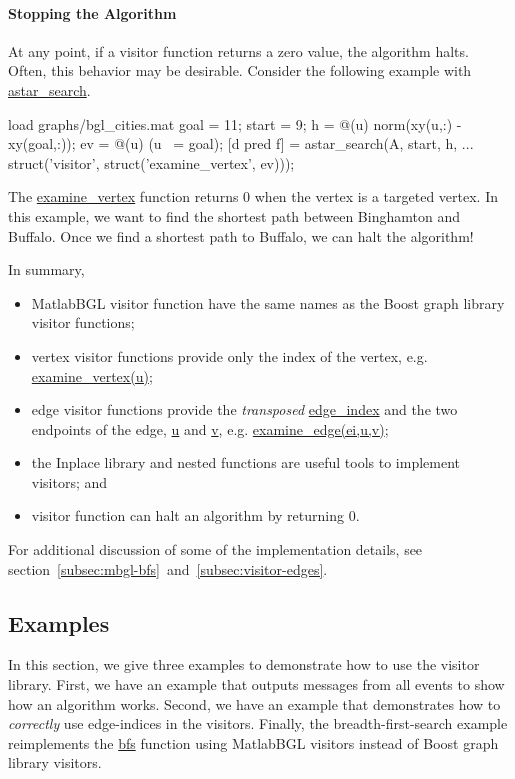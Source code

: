 \documentclass[12pt]{article}
\newcommand{\mycmd}[1]{\url{#1}}
\begin{document}
\paragraph{Stopping the Algorithm} At any point, if a visitor function returns a zero value, the algorithm halts.  Often, this behavior may be desirable.  Consider the following example with \mycmd{astar_search}.
\begin{mcode}
load graphs/bgl_cities.mat
goal = 11; %
start = 9; %
h = @(u) norm(xy(u,:) - xy(goal,:));
ev = @(u) (u ~= goal);
[d pred f] = astar_search(A, start, h, ...
    struct('visitor', struct('examine_vertex', ev)));
\end{mcode}
The \mycmd{examine_vertex} function returns 0 when the vertex is a targeted vertex.  In this example, we want to find the shortest path between Binghamton and Buffalo.  Once we find a shortest path to Buffalo, we can halt the algorithm!

In summary, 
\begin{itemize}
\item MatlabBGL visitor function have the same names as the Boost graph library visitor functions;
\item vertex visitor functions provide only the index of the vertex, e.g. \mycmd{examine_vertex(u)};
\item edge visitor functions provide the \emph{transposed} \mycmd{edge_index} and the two endpoints of the edge, \mycmd{u} and \mycmd{v}, e.g. \mycmd{examine_edge(ei,u,v)};
\item the Inplace library and nested functions are useful tools to implement visitors; and
\item visitor function can halt an algorithm by returning 0.
\end{itemize}

For additional discussion of some of the implementation details, see section~\ref{subsec:mbgl-bfs}~and~\ref{subsec:visitor-edges}.

\subsection{Examples}
\label{sec:visitors-examples}
In this section, we give three examples to demonstrate how to use the visitor library.  First, we have an example that outputs messages from all events to show how an algorithm works.  Second, we have an example that demonstrates how to \emph{correctly} use edge-indices in the visitors.  Finally, the breadth-first-search example reimplements the \mycmd{bfs} function using MatlabBGL visitors instead of Boost graph library visitors.
\end{document}
